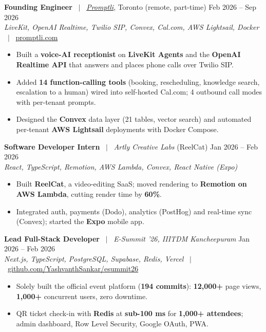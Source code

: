 \documentclass[a4paper,10pt]{article}
\begin{document}
\vspace{1pt}
\noindent\textbf{Founding Engineer} \ $|$ \ \textit{\href{https://promptli.com}{Promptli}}, Toronto (remote, part-time) \hfill Feb 2026 -- Sep 2026 \\[-2pt]
{\small \textit{LiveKit, OpenAI Realtime, Twilio SIP, Convex, Cal.com, AWS Lightsail, Docker} \ $|$ \ \href{https://promptli.com}{promptli.com}}
\begin{itemize}
    \item Built a \textbf{voice-AI receptionist} on \textbf{LiveKit Agents} and the \textbf{OpenAI Realtime API} that answers and places phone calls over Twilio SIP.
    \item Added \textbf{14 function-calling tools} (booking, rescheduling, knowledge search, escalation to a human) wired into self-hosted Cal.com; 4 outbound call modes with per-tenant prompts.
    \item Designed the \textbf{Convex} data layer (21 tables, vector search) and automated per-tenant \textbf{AWS Lightsail} deployments with Docker Compose.
\end{itemize}

\vspace{1pt}
\noindent\textbf{Software Developer Intern} \ $|$ \ \textit{Artly Creative Labs} (ReelCat) \hfill Jan 2026 -- Feb 2026 \\[-2pt]
{\small \textit{React, TypeScript, Remotion, AWS Lambda, Convex, React Native (Expo)}}
\begin{itemize}
    \item Built \textbf{ReelCat}, a video-editing SaaS; moved rendering to \textbf{Remotion on AWS Lambda}, cutting render time by \textbf{60\%}.
    \item Integrated auth, payments (Dodo), analytics (PostHog) and real-time sync (Convex); started the \textbf{Expo} mobile app.
\end{itemize}

\vspace{1pt}
\noindent\textbf{Lead Full-Stack Developer} \ $|$ \ \textit{E-Summit '26, IIITDM Kancheepuram} \hfill Jan 2026 -- Feb 2026 \\[-2pt]
{\small \textit{Next.js, TypeScript, PostgreSQL, Supabase, Redis, Vercel} \ $|$ \ \href{https://github.com/YashvanthSankar/esummit26}{github.com/YashvanthSankar/esummit26}}
\begin{itemize}
    \item Solely built the official event platform (\textbf{194 commits}): \textbf{12,000+} page views, \textbf{1,000+} concurrent users, zero downtime.
    \item QR ticket check-in with \textbf{Redis} at \textbf{sub-100 ms} for \textbf{1,000+ attendees}; admin dashboard, Row Level Security, Google OAuth, PWA.
\end{itemize}
\end{document}

